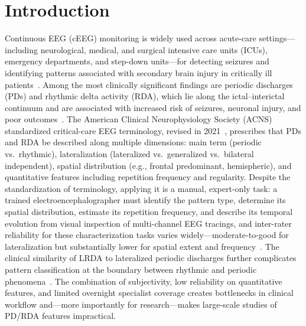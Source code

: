 \documentclass{iopjournal}
\begin{document}
\begin{abstract}
\textbf{Significance.} This work presents the first system to jointly characterize lateralization, spatial localization, discharge timing, and frequency for both periodic and rhythmic EEG patterns, achieving algorithm--expert agreement at the level of expert--expert agreement across all tasks. In post-hoc review of discordant cases, experts judged the algorithm's frequency estimates more accurate than the original expert labels in 94\% of cases. Automated characterization can now both substitute for and improve manual annotation in critical-care EEG.
\end{abstract}

\section{Introduction}
\label{sec:introduction}

Continuous EEG (cEEG) monitoring is widely used across acute-care settings---including neurological, medical, and surgical intensive care units (ICUs), emergency departments, and step-down units---for detecting seizures and identifying patterns associated with secondary brain injury in critically ill patients~\cite{claassen2004,zafar2020}. Among the most clinically significant findings are periodic discharges (PDs) and rhythmic delta activity (RDA), which lie along the ictal--interictal continuum and are associated with increased risk of seizures, neuronal injury, and poor outcomes~\cite{chong2005,rodriguez2017,vespa2016,struck2016,tao2020,parikh2023}. The American Clinical Neurophysiology Society (ACNS) standardized critical-care EEG terminology, revised in 2021~\cite{hirsch2021}, prescribes that PDs and RDA be described along multiple dimensions: main term (periodic vs.\ rhythmic), lateralization (lateralized vs.\ generalized vs.\ bilateral independent), spatial distribution (e.g., frontal predominant, hemispheric), and quantitative features including repetition frequency and regularity. Despite the standardization of terminology, applying it is a manual, expert-only task: a trained electroencephalographer must identify the pattern type, determine its spatial distribution, estimate its repetition frequency, and describe its temporal evolution from visual inspection of multi-channel EEG tracings, and inter-rater reliability for these characterization tasks varies widely---moderate-to-good for lateralization but substantially lower for spatial extent and frequency~\cite{gaspard2014,leitinger2015,jing2023irr}. The clinical similarity of LRDA to lateralized periodic discharges further complicates pattern classification at the boundary between rhythmic and periodic phenomena~\cite{gaspard2013}. The combination of subjectivity, low reliability on quantitative features, and limited overnight specialist coverage creates bottlenecks in clinical workflow and---more importantly for research---makes large-scale studies of PD/RDA features impractical.
\end{document}
